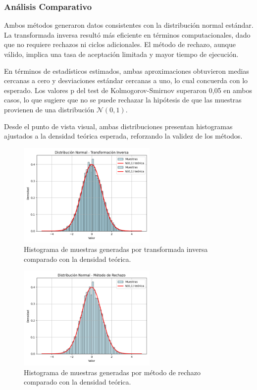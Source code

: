 \documentclass{article}
\begin{document}
\subsubsection{Análisis Comparativo}
Ambos métodos generaron datos consistentes con la distribución normal estándar. La transformada inversa resultó más eficiente en términos computacionales, dado que no requiere rechazos ni ciclos adicionales. El método de rechazo, aunque válido, implica una tasa de aceptación limitada y mayor tiempo de ejecución.

En términos de estadísticos estimados, ambas aproximaciones obtuvieron medias cercanas a cero y desviaciones estándar cercanas a uno, lo cual concuerda con lo esperado. Los valores p del test de Kolmogorov-Smirnov superaron 0{,}05 en ambos casos, lo que sugiere que no se puede rechazar la hipótesis de que las muestras provienen de una distribución $\mathcal{N}(0,1)$.

Desde el punto de vista visual, ambas distribuciones presentan histogramas ajustados a la densidad teórica esperada, reforzando la validez de los métodos.

\begin{figure}[H]
    \centering
    \includegraphics[width=0.6\textwidth]{visualizaciones/normal_inversa.png}
    \caption{Histograma de muestras generadas por transformada inversa comparado con la densidad teórica.}
    \label{fig:normal_inversa}
\end{figure}

\begin{figure}[H]
    \centering
    \includegraphics[width=0.6\textwidth]{visualizaciones/normal_rechazo.png}
    \caption{Histograma de muestras generadas por método de rechazo comparado con la densidad teórica.}
    \label{fig:normal_rechazo}
\end{figure}
\end{document}
